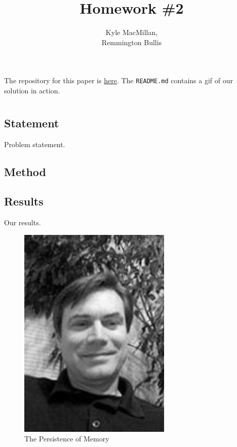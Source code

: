 \documentclass[12pt]{article}
\title{Homework \#2}
\author{Kyle MacMillan, \\Remmington Bullis}
\begin{document}
\maketitle

The repository for this paper is \href{https://github.com/macattackftw/ncGA}{here}. 
The \texttt{README.md} contains a gif of our solution in action.

\section{} %

\subsection{Statement}
Problem statement.

\subsection{Method}


\newpage
\subsection{Results}
Our results.

\begin{figure}[H]
\centering
\noindent\includegraphics[width=0.65\textwidth]{./images/jmcgough}
\caption{The Persistence of Memory}
\label{fig:jmcgough}
\end{figure}
\end{document}
